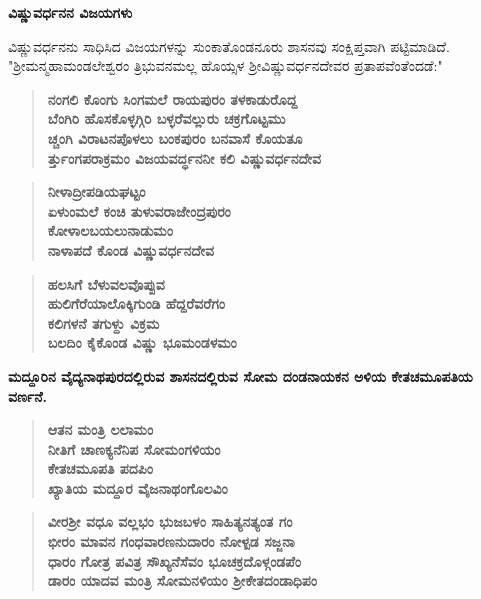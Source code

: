 \noindent
\textbf{ವಿಷ್ಣುವರ್ಧನನ ವಿಜಯಗಳು}

ವಿಷ್ಣುವರ್ಧನನು ಸಾಧಿಸಿದ ವಿಜಯಗಳನ್ನು ಸುಂಕಾತೊಂಡನೂರು ಶಾಸನವು ಸಂಕ್ಷಿಪ್ತವಾಗಿ ಪಟ್ಟಿಮಾಡಿದೆ. "ಶ‍್ರೀಮನ್ಮಹಾಮಂಡಲೇಶ್ವರಂ ತ್ರಿಭುವನಮಲ್ಲ ಹೊಯ್ಸಳ ಶ‍್ರೀವಿಷ್ಣುವರ್ಧನದೇವರ ಪ್ರತಾಪವೆಂತೆಂದಡೆ:"

\begin{verse}
\textbf{ನಂಗಲಿ ಕೊಂಗು ಸಿಂಗಮಲೆ ರಾಯಪುರಂ ತಳಕಾಡುರೊದ್ದ \\ ಬೆಂಗಿರಿ ಹೊಸಕೊಳ್ಳಗ್ಗಿರಿ ಬಳ್ಳರೆವಲ್ಲುರು ಚಕ್ರಗೊಟ್ಟಮು \\ ಚ್ಚಂಗಿ ವಿರಾಟನಪೊಳಲು ಬಂಕಪುರಂ ಬನವಾಸೆ ಕೊಯತೂ \\ರ್ತ್ತುಂಗಪರಾಕ್ರಮಂ ವಿಜಯವರ್ದ್ಧನನೀ ಕಲಿ ವಿಷ್ಣುವರ್ಧನದೇವ}
\end{verse}

\begin{verse}
\textbf{ನೀಳಾದ್ರೀಪಡಿಯಘಟ್ಟಂ \\ ಏಳುಂಮಲೆ ಕಂಚಿ ತುಳುವರಾಜೇಂದ್ರಪುರಂ \\ ಕೋಳಾಲಬಯಲುನಾಡುಮಂ \\ ನಾಳಾಪದೆ ಕೊಂಡ ವಿಷ್ಣುವರ್ಧನದೇವ}
\end{verse}

\begin{verse}
\textbf{ಹಲಸಿಗೆ ಬೆಳುವಲವೊಪ್ಪುವ \\ ಹುಲಿಗೆರೆಯಾಲೊಕ್ಕಿಗುಂಡಿ ಹೆದ್ದರೆವರೆಗಂ \\ ಕಲಿಗಳನೆ ತಗುಳ್ದು ವಿಕ್ರಮ \\ ಬಲದಿಂ ಕೈಕೊಂಡ ವಿಷ್ಣು ಭೂಮಂಡಳಮಂ}
\end{verse}

\noindent
\textbf{ಮದ್ದೂರಿನ ವೈದ್ಯನಾಥಪುರದಲ್ಲಿರುವ ಶಾಸನದಲ್ಲಿರುವ ಸೋಮ ದಂಡನಾಯಕನ ಅಳಿಯ ಕೇತಚಮೂಪತಿಯ ವರ್ಣನೆ.}

\begin{verse}
\textbf{ಆತನ ಮಂತ್ರಿ ಲಲಾಮಂ \\ ನೀತಿಗೆ ಚಾಣಕ್ಯನೆನಿಪ ಸೋಮಂಗಳಿಯಂ \\ ಕೇತಚಮೂಪತಿ ಪದಪಿಂ \\ ಖ್ಯಾತಿಯ ಮದ್ದೂರ ವೈಜನಾಥಂಗೊಲವಿಂ}
\end{verse}

\begin{verse}
\textbf{ವೀರಶ‍್ರೀ ವಧೂ ವಲ್ಲಭಂ ಭುಜಬಳಂ ಸಾಹಿತ್ಯನತ್ಯಂತ ಗಂ \\ ಭೀರಂ ಮಾವನ ಗಂಧವಾರಣನುದಾರಂ ನೋಳ್ಪಡ ಸಜ್ಜನಾ \\ ಧಾರಂ ಗೋತ್ರ ಪವಿತ್ರ ಸೌಖ್ಯನೆಸೆವಂ ಭೂಚಕ್ರದೊಳ್ಗಂಡಪೆಂ \\ ಡಾರಂ ಯಾದವ ಮಂತ್ರಿ ಸೋಮನಳಿಯಂ ಶ‍್ರೀಕೇತದಂಡಾಧಿಪಂ}
\end{verse}

